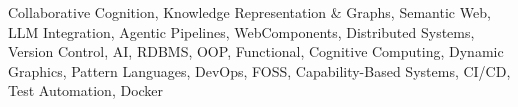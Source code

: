 \begin{par}\small{
Collaborative Cognition,
Knowledge Representation \& Graphs,
Semantic Web,
LLM Integration,
Agentic Pipelines,
WebComponents,
Distributed Systems,
Version Control,
AI,
RDBMS,
OOP,
Functional,
Cognitive Computing,
Dynamic Graphics,
Pattern Languages,
DevOps,
FOSS,
Capability-Based Systems,
CI/CD,
Test Automation,
Docker}
\end{par}
